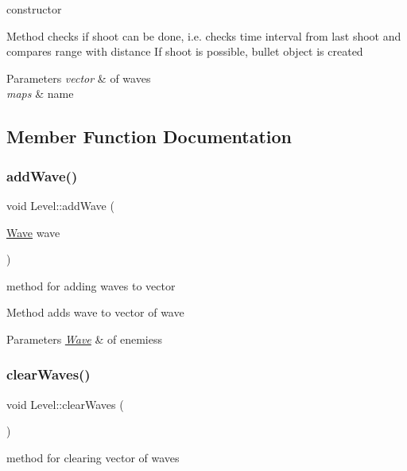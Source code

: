 constructor 

Method checks if shoot can be done, i.\+e. checks time interval from last shoot and compares range with distance If shoot is possible, bullet object is created 
\begin{DoxyParams}{Parameters}
{\em vector} & of waves \\
\hline
{\em map\textquotesingle{}s} & name \\
\hline
\end{DoxyParams}


\subsection{Member Function Documentation}
\mbox{\label{class_level_a1aa9a0d5da3c3a2763620de72c336dcc}} 
\subsubsection{\texorpdfstring{add\+Wave()}{addWave()}}
{\footnotesize\ttfamily void Level\+::add\+Wave (\begin{DoxyParamCaption}\item[{\mbox{\hyperlink{class_wave}{Wave}}}]{wave }\end{DoxyParamCaption})}



method for adding waves to vector 

Method adds wave to vector of wave 
\begin{DoxyParams}{Parameters}
{\em \mbox{\hyperlink{class_wave}{Wave}}} & of enemiess \\
\hline
\end{DoxyParams}
\mbox{\label{class_level_a8ffc6f7c57173c9399aa8755b4435353}} 
\subsubsection{\texorpdfstring{clear\+Waves()}{clearWaves()}}
{\footnotesize\ttfamily void Level\+::clear\+Waves (\begin{DoxyParamCaption}{ }\end{DoxyParamCaption})}



method for clearing vector of waves 

